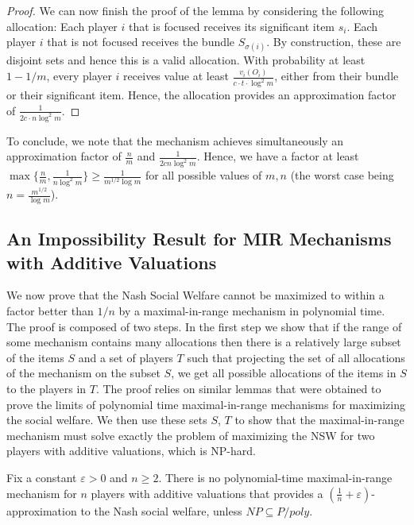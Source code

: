 \documentclass{theoretics}
\newcommand{\eps}{\varepsilon}
\begin{document}
\begin{proof}
We can now finish the proof of the lemma by considering the following allocation: Each player $i$ that is focused receives its significant item $s_i$. Each player $i$ that is not focused receives the bundle $S_{\sigma(i)}$. By construction, these are disjoint sets and hence this is a valid allocation. With probability at least $1-1/m$, every player $i$ receives value at least $\frac{v_i(O_i)}{c \cdot t \cdot \log^2 m}$, either from their bundle or their significant item.
Hence, the allocation provides an approximation factor of $\frac{1} {2c \cdot n \log^2 m}$.
\end{proof}

To conclude, we note that the mechanism achieves simultaneously an approximation factor of $\frac{n}{m}$ and $\frac{1}{2c n \log^2 m}$. 
Hence, we have a factor at least $\max \{\frac n m, \frac{1}{n \log^2 m} \} \geq \frac{1}{m^{1/2} \log m}$ for all possible values of $m,n$ (the worst case being $n = \frac{m^{1/2}}{\log m}$).



\subsection{An Impossibility Result for MIR Mechanisms with Additive Valuations}\label{subsec-hardness}

We now prove that the Nash Social Welfare cannot be maximized to within a factor better than $1/n$ by a maximal-in-range mechanism in polynomial time. The proof is composed of two steps. In the first step we show that if the range of some mechanism contains many allocations then there is a relatively large subset of the items $S$ and a set of players $T$ such that projecting the set of all allocations of the mechanism on the subset $S$, we get all possible allocations of the items in $S$ to the players in $T$. The proof relies on similar lemmas that were obtained to prove the limits of polynomial time maximal-in-range mechanisms for maximizing the social welfare. We then use these sets $S$, $T$ to show that the maximal-in-range mechanism must solve exactly the problem of maximizing the NSW for two players with additive valuations, which is NP-hard.

\begin{theorem}
Fix a constant $\eps>0$ and $n \geq 2$. There is no polynomial-time maximal-in-range mechanism for $n$ players with additive valuations that provides a $(\frac{1}{n}+\eps)$-approximation to the Nash social welfare, unless $NP\subseteq P/poly$.
\end{theorem}
\end{document}
